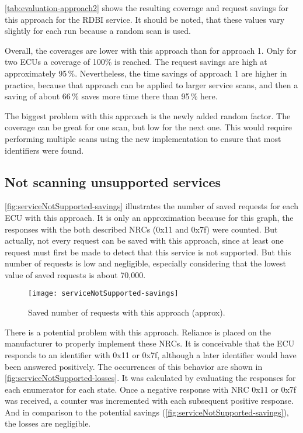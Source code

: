 \autoref{tab:evaluation-approach2} shows the resulting coverage and request savings for this approach for the RDBI service. It should be noted, that these values vary slightly for each run because a random scan is used.

Overall, the coverages are lower with this approach than for approach 1. Only for two ECUs a coverage of 100\% is reached. The request savings are high at approximately 95\,\%. Nevertheless, the time savings of approach 1 are higher in practice, because that approach can be applied to larger service scans, and then a saving of about 66\,\% saves more time there than 95\,\% here.

The biggest problem with this approach is the newly added random factor. The coverage can be great for one scan, but low for the next one. This would require performing multiple scans using the new implementation to ensure that most identifiers were found.

\subsection{Not scanning unsupported services}

\autoref{fig:serviceNotSupported-savings} illustrates the number of saved requests for each ECU with this approach. It is only an approximation because for this graph, the responses with the both described NRCs (0x11 and 0x7f) were counted. But actually, not every request can be saved with this approach, since at least one request must first be made to detect that this service is not supported. But this number of requests is low and negligible, especially considering that the lowest value of saved requests is about 70,000.

\begin{figure}[htb]
    \centering
    \texttt{[image: serviceNotSupported-savings]}
    \caption{Saved number of requests with this approach (approx).}
    \label{fig:serviceNotSupported-savings}
\end{figure}

There is a potential problem with this approach. Reliance is placed on the manufacturer to properly implement these NRCs. It is conceivable that the ECU responds to an identifier with 0x11 or 0x7f, although a later identifier would have been answered positively. The occurrences of this behavior are shown in \autoref{fig:serviceNotSupported-losses}. It was calculated by evaluating the responses for each enumerator for each state. Once a negative response with NRC 0x11 or 0x7f was received, a counter was incremented with each subsequent positive response.
And in comparison to the potential savings (\autoref{fig:serviceNotSupported-savings}), the losses are negligible.

